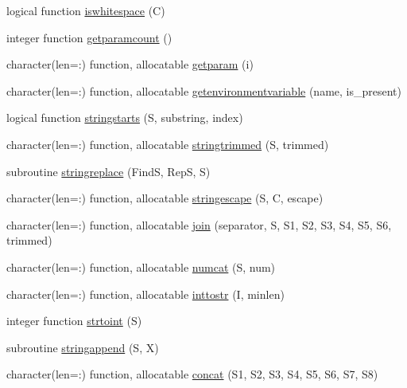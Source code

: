 \begin{DoxyCompactItemize}
\item 
logical function \mbox{\hyperlink{namespacestringutils_ae4eb174b5b8dcf64a0a61be0519ea343}{iswhitespace}} (C)
\item 
integer function \mbox{\hyperlink{namespacestringutils_a8837c1b537afbf19f8138389d9cdf434}{getparamcount}} ()
\item 
character(len=\+:) function, allocatable \mbox{\hyperlink{namespacestringutils_a4553b9553b31c1e21fe6b70b54fde501}{getparam}} (i)
\item 
character(len=\+:) function, allocatable \mbox{\hyperlink{namespacestringutils_a7869404fd42c1f41212cbd62a5e225f3}{getenvironmentvariable}} (name, is\+\_\+present)
\item 
logical function \mbox{\hyperlink{namespacestringutils_a83f80ac2eecd8ff5e8fd18faba396ec9}{stringstarts}} (S, substring, index)
\item 
character(len=\+:) function, allocatable \mbox{\hyperlink{namespacestringutils_ac5e67eb0a4de77625ac1447804e1f934}{stringtrimmed}} (S, trimmed)
\item 
subroutine \mbox{\hyperlink{namespacestringutils_aaf1a42410d8de4ec72b5f8f00f538f35}{stringreplace}} (FindS, RepS, S)
\item 
character(len=\+:) function, allocatable \mbox{\hyperlink{namespacestringutils_a077361529d56f5b3f1903f5a145a4745}{stringescape}} (S, C, escape)
\item 
character(len=\+:) function, allocatable \mbox{\hyperlink{namespacestringutils_a29f32cf04e0c44fc8ee8dfa9819b915d}{join}} (separator, S, S1, S2, S3, S4, S5, S6, trimmed)
\item 
character(len=\+:) function, allocatable \mbox{\hyperlink{namespacestringutils_af68508e2bb36d836c0f94f476f728cb3}{numcat}} (S, num)
\item 
character(len=\+:) function, allocatable \mbox{\hyperlink{namespacestringutils_a8308d148fc2d1fd7e23aea926bfd837f}{inttostr}} (I, minlen)
\item 
integer function \mbox{\hyperlink{namespacestringutils_af51a1a8adbae76da62979f25232bd8df}{strtoint}} (S)
\item 
subroutine \mbox{\hyperlink{namespacestringutils_a921ef80710acba9d901b45479ddae08d}{stringappend}} (S, X)
\item 
character(len=\+:) function, allocatable \mbox{\hyperlink{namespacestringutils_a19e683b9de4f769c4fe0afc48a7b45d0}{concat}} (S1, S2, S3, S4, S5, S6, S7, S8)
\item 

\end{DoxyCompactItemize}
